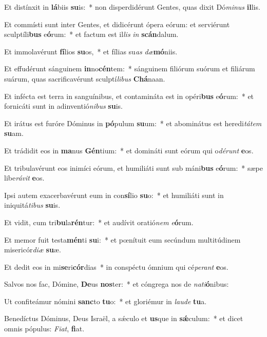 \item Et distínxit in \textbf{lá}biis \textbf{su}is:~* non disperdidérunt Gentes, quas dixit Dó\textit{mi}\textit{nus} \textbf{il}lis.
\item Et commísti sunt inter Gentes, et didicérunt ópera eórum: et serviérunt sculptíli\textbf{bus} e\textbf{ó}rum:~* et factum est il\textit{lis} \textit{in} \textbf{scán}dalum.
\item Et immolavérunt \textbf{fí}lios \textbf{su}os,~* et fílias su\textit{as} \textit{dæ}\textbf{mó}niis.
\item Et effudérunt sánguinem \textbf{in}no\textbf{cén}tem:~* sánguinem filiórum suórum et filiárum suárum, quas sacrificavérunt sculptí\textit{li}\textit{bus} \textbf{Chá}naan.
\item Et infécta est terra in sanguínibus, et contamináta est in opéri\textbf{bus} e\textbf{ó}rum:~* et fornicáti sunt in adinventió\textit{ni}\textit{bus} \textbf{su}is.
\item Et irátus est furóre Dóminus in \textbf{pó}pulum \textbf{su}um:~* et abominátus est heredi\textit{tá}\textit{tem} \textbf{su}am.
\item Et trádidit eos in \textbf{ma}nus \textbf{Gén}tium:~* et domináti sunt eórum qui o\textit{dé}\textit{runt} \textbf{e}os.
\item Et tribulavérunt eos inimíci eórum, et humiliáti sunt sub máni\textbf{bus} e\textbf{ó}rum:~* sæpe libe\textit{rá}\textit{vit} \textbf{e}os.
\item Ipsi autem exacerbavérunt eum in con\textbf{sí}lio \textbf{su}o:~* et humiliáti sunt in iniquitá\textit{ti}\textit{bus} \textbf{su}is.
\item Et vidit, cum tri\textbf{bu}la\textbf{rén}tur:~* et audívit oratió\textit{nem} \textit{e}\textbf{ó}rum.
\item Et memor fuit testa\textbf{mén}ti \textbf{su}i:~* et pœnítuit eum secúndum multitúdinem misericór\textit{di}\textit{æ} \textbf{su}æ.
\item Et dedit eos in mi\textbf{se}ri\textbf{cór}dias~* in conspéctu ómnium qui cé\textit{pe}\textit{rant} \textbf{e}os.
\item Salvos nos fac, Dómine, \textbf{De}us \textbf{nos}ter:~* et cóngrega nos de \textit{na}\textit{ti}\textbf{ó}nibus:
\item Ut confiteámur nómini \textbf{sanc}to \textbf{tu}o:~* et gloriémur in \textit{lau}\textit{de} \textbf{tu}a.
\item Benedíctus Dóminus, Deus Israël, a sǽculo et \textbf{us}que in \textbf{sǽ}culum:~* et dicet omnis pópulus: \textit{Fi}\textit{at}, \textbf{fi}at.
